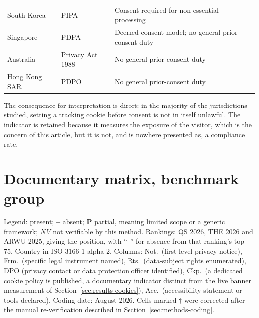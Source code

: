 \documentclass[pdflatex,sn-basic,Numbered]{sn-jnl}
\newcommand{\si}{\ding{51}}
\newcommand{\no}{\textcolor{gris}{\textbf{--}}}
\newcommand{\nv}{\textsl{\footnotesize NV}}
\theoremstyle{thmstyleone}
\theoremstyle{thmstyletwo}
\theoremstyle{thmstylethree}
\begin{document}
\begin{appendices}
\begin{longtable}{@{}>{\RaggedRight}p{2.4cm}>{\RaggedRight}p{5.5cm}>{\RaggedRight\arraybackslash}p{4.1cm}@{}}
	\addlinespace
	South Korea & PIPA \citep{pipa2011} & Consent required for non-essential processing \\
	\addlinespace
	Singapore & PDPA \citep{pdpa2012} & Deemed consent model; no general prior-consent duty \\
	\addlinespace
	Australia & Privacy Act 1988 \citep{privacyact1988} & No general prior-consent duty \\
	\addlinespace
	Hong Kong SAR & PDPO \citep{pdpo_hk} & No general prior-consent duty \\
\end{longtable}
\normalsize

The consequence for interpretation is direct: in the majority of the jurisdictions studied, setting a tracking cookie before consent is not in itself unlawful. The indicator is retained because it measures the exposure of the visitor, which is the concern of this article, but it is not, and is nowhere presented as, a compliance rate.

\section{Documentary matrix, benchmark group}\label{ap:mundo}
\setcounter{table}{0}\setcounter{figure}{0}

Legend: \si{} present; \no{} absent; \textbf{P} partial, meaning limited scope or a generic framework; \nv{} not verifiable by this method. Rankings: QS 2026, THE 2026 and ARWU 2025, giving the position, with ``--'' for absence from that ranking's top 75. Country in ISO 3166-1 alpha-2. Columns: Not.\ (first-level privacy notice), Frm.\ (specific legal instrument named), Rts.\ (data-subject rights enumerated), DPO (privacy contact or data protection officer identified), Ckp.\ (a dedicated cookie policy is published, a documentary indicator distinct from the live banner measurement of Section~\ref{sec:results-cookies}), Acc.\ (accessibility statement or tools declared). Coding date: August 2026. Cells marked $\dagger$ were corrected after the manual re-verification described in Section~\ref{sec:methods-coding}.


\end{appendices}
\end{document}
